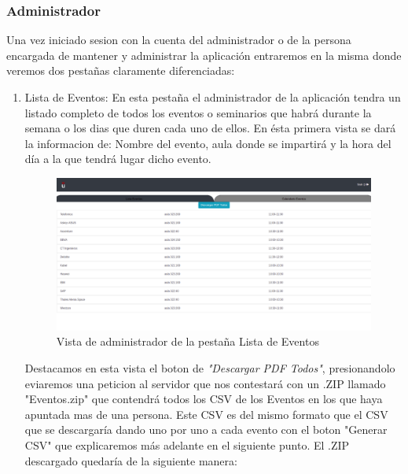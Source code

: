 \documentclass[a4paper, 12pt]{book}
\begin{document}
\subsubsection{Administrador}
	Una vez iniciado sesion con la cuenta del administrador o de la persona encargada de mantener y administrar la aplicación entraremos en la misma donde veremos dos pestañas claramente diferenciadas:
\begin{enumerate}	
	\item Lista de Eventos: En esta pestaña el administrador de la aplicación tendra un listado completo de todos los eventos o seminarios que habrá durante la semana o los dias que duren cada uno de ellos. En ésta primera vista se dará la informacion de: Nombre del evento, aula donde se impartirá y la hora del día a la que tendrá lugar dicho evento.
	\begin{figure}[H]
  	\centering
  	\includegraphics[width=16cm, keepaspectratio]{img/adminListaEventos.png}
  	\caption{Vista de administrador de la pestaña Lista de Eventos}\label{fig:adminListaEventos}
	\end{figure}

Destacamos en esta vista el boton de \textit{"Descargar PDF Todos"}, presionandolo eviaremos una peticion al servidor que nos contestará con un .ZIP llamado "Eventos.zip" que contendrá todos los CSV de los Eventos en los que haya apuntada mas de una persona. Este CSV es del mismo formato que el CSV que se descargaría dando uno por uno a cada evento con el boton "Generar CSV" que explicaremos más adelante en el siguiente punto. El .ZIP descargado quedaría de la siguiente manera:
	

\end{enumerate}
\end{document}
